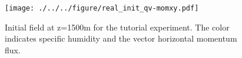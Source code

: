 \begin{figure}[h]
\begin{center}
  \texttt{[image: ./../../figure/real\_init\_qv-momxy.pdf]}\\
  \caption{Initial field at z=1500m for the tutorial experiment.
    The color indicates specific humidity and the vector horizontal momentum flux.}
  \label{fig:init}
\end{center}
\end{figure}

